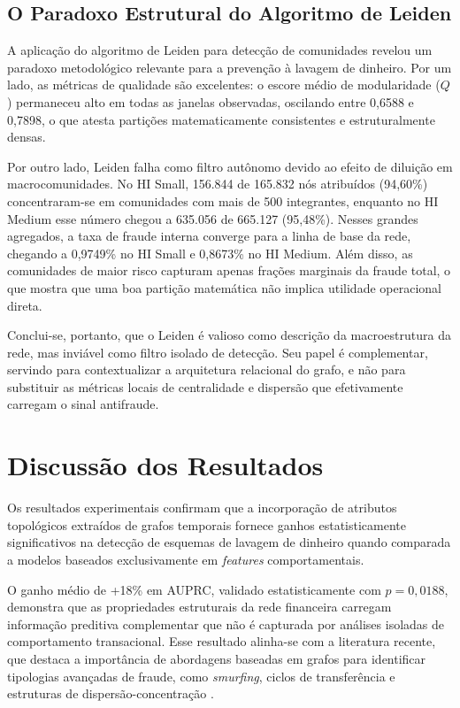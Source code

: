 \documentclass[a4paper,12pt,oneside,onecolumn,final,fleqn]{repUERJ}
\begin{document}
\subsection{O Paradoxo Estrutural do Algoritmo de Leiden}
\label{subsec:paradoxo_leiden}

A aplicação do algoritmo de Leiden para detecção de comunidades revelou um paradoxo metodológico relevante para a prevenção à lavagem de dinheiro. Por um lado, as métricas de qualidade são excelentes: o escore médio de modularidade ($Q$) permaneceu alto em todas as janelas observadas, oscilando entre 0,6588 e 0,7898, o que atesta partições matematicamente consistentes e estruturalmente densas.

Por outro lado, Leiden falha como filtro autônomo devido ao efeito de diluição em macrocomunidades. No HI Small, 156.844 de 165.832 nós atribuídos (94,60\%) concentraram-se em comunidades com mais de 500 integrantes, enquanto no HI Medium esse número chegou a 635.056 de 665.127 (95,48\%). Nesses grandes agregados, a taxa de fraude interna converge para a linha de base da rede, chegando a 0,9749\% no HI Small e 0,8673\% no HI Medium. Além disso, as comunidades de maior risco capturam apenas frações marginais da fraude total, o que mostra que uma boa partição matemática não implica utilidade operacional direta.

Conclui-se, portanto, que o Leiden é valioso como descrição da macroestrutura da rede, mas inviável como filtro isolado de detecção. Seu papel é complementar, servindo para contextualizar a arquitetura relacional do grafo, e não para substituir as métricas locais de centralidade e dispersão que efetivamente carregam o sinal antifraude.

\section{Discussão dos Resultados}

Os resultados experimentais confirmam que a incorporação de atributos topológicos extraídos de grafos temporais fornece ganhos estatisticamente significativos na detecção de esquemas de lavagem de dinheiro quando comparada a modelos baseados exclusivamente em \textit{features} comportamentais.

O ganho médio de +18\% em AUPRC, validado estatisticamente com $p = 0{,}0188$, demonstra que as propriedades estruturais da rede financeira carregam informação preditiva complementar que não é capturada por análises isoladas de comportamento transacional. Esse resultado alinha-se com a literatura recente, que destaca a importância de abordagens baseadas em grafos para identificar tipologias avançadas de fraude, como \textit{smurfing}, ciclos de transferência e estruturas de dispersão-concentração \cite{cheng2025graph,baigabyl2025using}.
\end{document}
